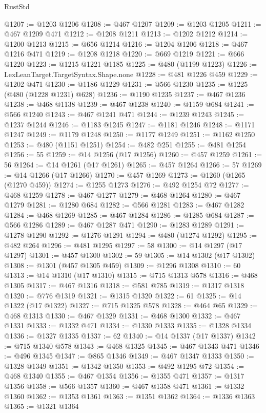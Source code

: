 \begin{lexlean}{RustStd}
\begin{coremodule}
@1207 := @1203 @1206
@1208 := @467 @1207
@1209 := @1203 @1205
@1211 := @467 @1209 @471
@1212 := @1208 @1211
@1213 := @1202 @1212
@1214 := @1200 @1213
@1215 := @656 @1214
@1216 := @1204 @1206
@1218 := @467 @1216 @471
@1219 := @1208 @1218
@1220 := @669 @1219
@1221 := @666 @1220
@1223 := @1215 @1221 @1185
@1225 := @480 (@1199 @1223)
@1226 := LexLeanTarget.TargetSyntax.Shape.none
@1228 := @481 @1226 @459
@1229 := @1202 @471
@1230 := @1186 @1229
@1231 := @566 @1230
@1235 := @1225 (@480 (@1228 @1231) @628)
@1236 := @1190 @1235
@1237 := @467 @1236
@1238 := @468 @1138
@1239 := @467 @1238
@1240 := @1159 @684
@1241 := @566 @1240
@1243 := @467 @1241 @471
@1244 := @1239 @1243
@1245 := @1237 @1244
@1246 := @1183 @1245
@1247 := @1181 @1246
@1248 := @1171 @1247
@1249 := @1179 @1248
@1250 := @1177 @1249
@1251 := @1162 @1250
@1253 := @480 (@1151 @1251)
@1254 := @482 @251
@1255 := @481 @1254
@1256 := 55
@1259 := @14 @1256 (@17 @1256)
@1260 := @457 @1259
@1261 := 56
@1264 := @14 @1261 (@17 @1261)
@1265 := @457 @1264
@1266 := 57
@1269 := @14 @1266 (@17 @1266)
@1270 := @457 @1269
@1273 := @1260 (@1265 (@1270 @459))
@1274 := @1255 @1273
@1276 := @492 @1254 @72
@1277 := @468 @1259
@1278 := @467 @1277
@1279 := @468 @1264
@1280 := @467 @1279
@1281 := @1280 @684
@1282 := @566 @1281
@1283 := @467 @1282
@1284 := @468 @1269
@1285 := @467 @1284
@1286 := @1285 @684
@1287 := @566 @1286
@1289 := @467 @1287 @471
@1290 := @1283 @1289
@1291 := @1278 @1290
@1292 := @1276 @1291
@1294 := @480 (@1274 @1292)
@1295 := @482 @264
@1296 := @481 @1295
@1297 := 58
@1300 := @14 @1297 (@17 @1297)
@1301 := @457 @1300
@1302 := 59
@1305 := @14 @1302 (@17 @1302)
@1308 := @1301 (@457 @1305 @459)
@1309 := @1296 @1308
@1310 := 60
@1313 := @14 @1310 (@17 @1310)
@1315 := @715 @1313 @578
@1316 := @468 @1305
@1317 := @467 @1316
@1318 := @581 @785
@1319 := @1317 @1318
@1320 := @776 @1319
@1321 := @1315 @1320
@1322 := 61
@1325 := @14 @1322 (@17 @1322)
@1327 := @715 @1325 @578
@1328 := @464 @65
@1329 := @468 @1313
@1330 := @467 @1329
@1331 := @468 @1300
@1332 := @467 @1331
@1333 := @1332 @471
@1334 := @1330 @1333
@1335 := @1328 @1334
@1336 := @1327 @1335
@1337 := 62
@1340 := @14 @1337 (@17 @1337)
@1342 := @715 @1340 @578
@1343 := @468 @1325
@1345 := @467 @1343 @471
@1346 := @496 @1345
@1347 := @865 @1346
@1349 := @467 @1347 @1333
@1350 := @1328 @1349
@1351 := @1342 @1350
@1353 := @492 @1295 @72
@1354 := @468 @1340
@1355 := @467 @1354
@1356 := @1355 @471
@1357 := @1317 @1356
@1358 := @566 @1357
@1360 := @467 @1358 @471
@1361 := @1332 @1360
@1362 := @1353 @1361
@1363 := @1351 @1362
@1364 := @1336 @1363
@1365 := @1321 @1364

\end{coremodule}
\end{lexlean}
